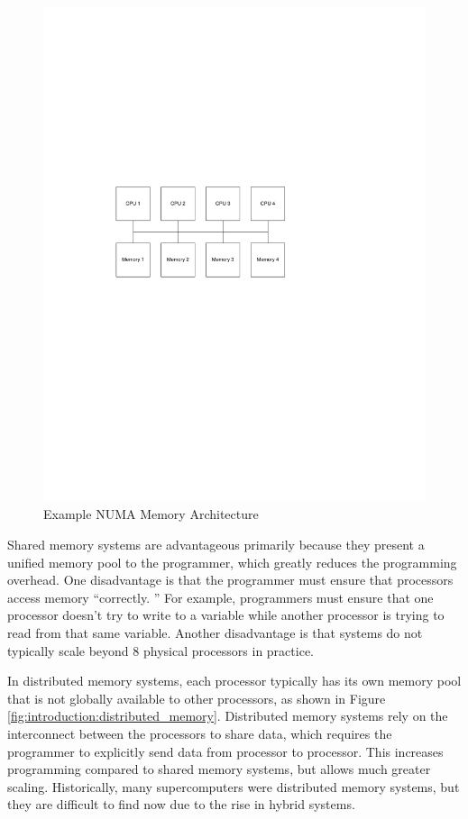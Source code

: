 \begin{figure}[ptb]
	\begin{centering}
		\includegraphics{Introduction/Figures/introduction-shared_memory_numa.pdf}
		\caption{Example NUMA Memory Architecture}
		\label{fig:introduction:numa}
	\end{centering}
\end{figure}

Shared memory systems are advantageous primarily because they present a unified memory pool to the programmer, which greatly reduces the programming overhead. One disadvantage is that the programmer must ensure that processors access memory ``correctly. '' For example, programmers must ensure that one processor doesn't try to write to a variable while another processor is trying to read from that same variable. Another disadvantage is that systems do not typically scale beyond 8 physical processors in practice.

In distributed memory systems, each processor typically has its own memory pool that is not globally available to other processors, as shown in Figure \ref{fig:introduction:distributed_memory}. Distributed memory systems rely on the interconnect between the processors to share data, which requires the programmer to explicitly send data from processor to processor. This increases programming compared to shared memory systems, but allows much greater scaling. Historically, many supercomputers were distributed memory systems, but they are difficult to find now due to the rise in hybrid systems.


